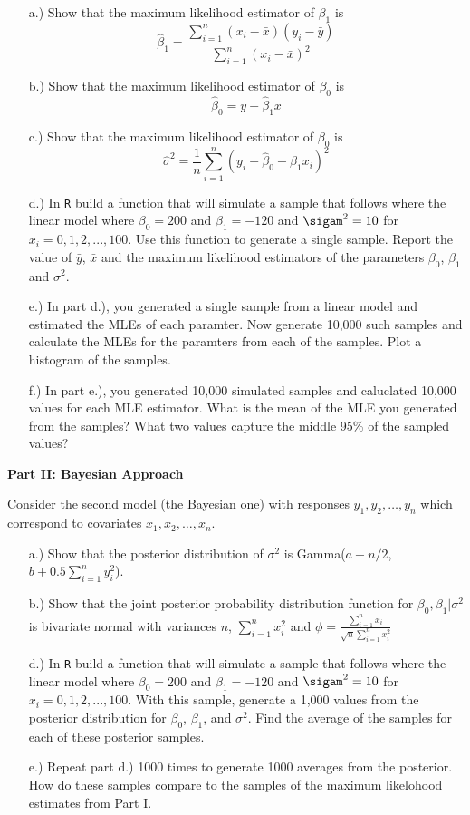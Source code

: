 \documentclass[11pt]{article}\usepackage[]{graphicx}\usepackage[]{color}
\begin{document}
\begin{itemize}
   \item[a.)] Show that the maximum likelihood estimator of $\beta_1$ is 
      \[
         \hat{\beta}_1 = \dfrac{\sum_{i=1}^n (x_i - \bar{x})(y_i - \bar{y})}{\sum_{i=1}^n (x_i - \bar{x})^2}
      \]
   \item[b.)] Show that the maximum likelihood estimator of $\beta_0$ is 
      \[
         \hat{\beta}_0 = \bar{y} - \hat{\beta}_1 \bar{x} 
      \]
   \item[c.)] Show that the maximum likelihood estimator of $\beta_0$ is 
      \[
         \hat{\sigma}^2 = \frac{1}{n} \sum_{i=1}^n \left(y_i - \hat{\beta}_0 - \hat{\beta}_1 x_i \right)^2
      \]
   \item[d.)] In \verb!R! build a function that will simulate a sample that follows where the linear model where $\beta_0 = 200$ and $\beta_1 = -120$ and $\sigam^2 = 10$ for $x_i = 0, 1, 2, ..., 100$. Use this function to generate a single sample. Report the value of $\bar{y}$, $\bar{x}$ and the maximum likelihood estimators of the parameters $\beta_0$, $\beta_1$ and $\sigma^2$.
   \item[e.)] In part d.), you generated a single sample from a linear model and estimated the MLEs of each paramter. Now generate 10,000 such samples and calculate the MLEs for the paramters from each of the samples. Plot a histogram of the samples.
   \item[f.)] In part e.), you generated 10,000 simulated samples and caluclated 10,000 values for each MLE estimator. What is the mean of the MLE you generated from the samples? What two values capture the middle 95\% of the sampled values?
\end{itemize}


\textbf{Part II: Bayesian Approach}

Consider the second model (the Bayesian one) with responses $y_1, y_2, \ldots, y_n$ which correspond to covariates $x_1, x_2, \ldots, x_n$.

\begin{itemize}
   \item[a.)] Show that the posterior distribution of $\sigma^2$ is Gamma($a + n/2$, $b + 0.5 \sum_{i=1}^n y_i^2$).
   \item[b.)] Show that the joint posterior probability distribution function for 
      $\beta_0, \beta_1 | \sigma^2$
      is bivariate normal with variances 
      $n$, 
      $\sum_{i=1}^n x_i^2$
      and 
      $\phi = \frac{\sum_{i=1}^n x_i}{\sqrt{n}{\sum_{i=1}^n x_i^2}}$

   \item[d.)] In \verb!R! build a function that will simulate a sample that follows where the linear model where $\beta_0 = 200$ and $\beta_1 = -120$ and $\sigam^2 = 10$ for $x_i = 0, 1, 2, ..., 100$.  With this sample, generate a 1,000 values from the posterior distribution for $\beta_0$, $\beta_1$, and $\sigma^2$. Find the average of the samples for each of these posterior samples.
   \item[e.)] Repeat part d.) 1000 times to generate 1000 averages from the posterior. How do these samples compare to the samples of the maximum likelohood estimates from Part I.
\end{itemize}
\end{document}
